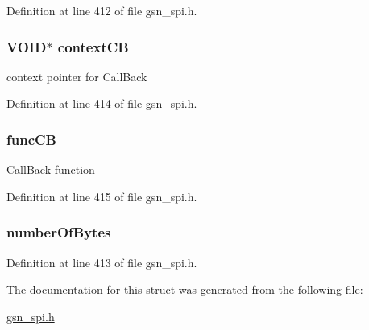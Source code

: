 Definition at line 412 of file gsn\_\-spi.h.

\hypertarget{a00241_a2898b010839acbc30fb49ec89189292c}{
\subsubsection[{contextCB}]{\setlength{\rightskip}{0pt plus 5cm}VOID$\ast$ {\bf contextCB}}}
\label{a00241_a2898b010839acbc30fb49ec89189292c}
context pointer for CallBack 

Definition at line 414 of file gsn\_\-spi.h.

\hypertarget{a00241_a7565371ad01b87c0d5ea21f355505f4b}{
\subsubsection[{funcCB}]{ {\bf funcCB}}}
\label{a00241_a7565371ad01b87c0d5ea21f355505f4b}
CallBack function 

Definition at line 415 of file gsn\_\-spi.h.

\hypertarget{a00241_aa38439c1a3431e9af92418009b525efa}{
\subsubsection[{numberOfBytes}]{ {\bf numberOfBytes}}}
\label{a00241_aa38439c1a3431e9af92418009b525efa}


Definition at line 413 of file gsn\_\-spi.h.



The documentation for this struct was generated from the following file:\begin{DoxyCompactItemize}
\item 
\hyperlink{a00587}{gsn\_\-spi.h}\end{DoxyCompactItemize}
